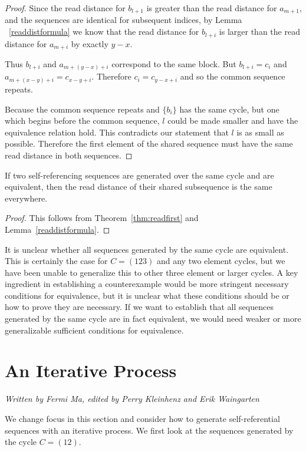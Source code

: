 \documentclass[runningheads,a4paper]{llncs}
\begin{document}
\begin{proof}
Since the read distance for $b_{l+1}$ is greater than the read distance for $a_{m+1}$, and the sequences are identical for subsequent indices, by Lemma ~\ref{readdistformula} we know that the read distance for $b_{l+i}$ is larger than the read distance for $a_{m+i}$ by exactly $y-x$. 

Thus $b_{l+i}$ and $a_{m+(y-x)+i}$ correspond to the same block. But $b_{l+i} = c_{i}$ and $a_{m+(x-y)+i}=c_{x-y+i}$. Therefore $c_{i} = c_{y-x+i}$ and so the common sequence repeats. 

Because the common sequence repeats and $\{b_i\}$ has the same cycle, but one which begins before the common sequence, $l$ could be made smaller and have the equivalence relation hold. This contradicts our statement that $l$ is as small as possible. Therefore the first element of the shared sequence must have the same read distance in both sequences. 
\end{proof}

\begin{corollary}
If two self-referencing sequences are generated over the same cycle and are equivalent, then the read distance of their shared subsequence is the same everywhere.
\end{corollary}

\begin{proof}
This follows from Theorem~\ref{thm:readfirst} and Lemma~\ref{readdistformula}.
\end{proof}

It is unclear whether all sequences generated by the same cycle are equivalent. This is certainly the case for $C=(123)$ and any two element cycles, but we have been unable to generalize this to other three element or larger cycles. A key ingredient in establishing a counterexample would be more stringent necessary conditions for equivalence, but it is unclear what these conditions should be or how to prove they are necessary. If we want to establish that all sequences generated by the same cycle are in fact equivalent, we would need weaker or more generalizable sufficient conditions for equivalence. 

\section{An Iterative Process}
\label{iterativeprocess}

\emph{Written by Fermi Ma, edited by Perry Kleinhenz and Erik Waingarten}

We change focus in this section and consider how to generate self-referential sequences with an iterative process. We first look at the sequences generated by the cycle $C = (1 2)$.
\end{document}
